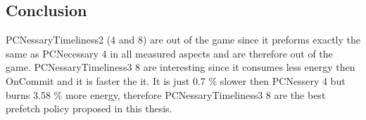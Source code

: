 

\subsection{Conclusion}
PCNessaryTimeliness2 (4 and 8) are out of the game since it preforms exactly the same as PCNecessary 4 in all measured aspects and are therefore out of the game. PCNessaryTimeliness3 8 are interesting since it consumes less energy then OnCommit and it is faster the it. It is just 0.7 \% slower then PCNessery 4 but burns 3.58 \% more energy, therefore PCNessaryTimeliness3 8 are the best prefetch policy proposed in this thesis.
